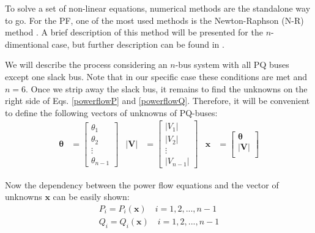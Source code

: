 \documentclass[a4paper,11pt, titlepage, twoside]{article}
\begin{document}
To solve a set of non-linear equations, numerical methods are the standalone way to go. For the PF, one of the most used methods is the Newton-Raphson (N-R) method \cite{NRusual}. A brief description of this method will be presented for the $n$-dimentional case, but further description can be found in \cite{llibrebase}.

We will describe the process considering an $n$-bus system with all PQ buses except one slack bus. Note that in our specific case these conditions are met and $n = 6$. Once we strip away the slack bus, it remains to find the unknowns on the right side of Eqs. \ref{powerflowP} and \ref{powerflowQ}. Therefore, it will be convenient to
define the following vectors of unknowns of PQ-buses:
\begin{equation}
\begin{aligned}
    \mathbf{\theta} &= \begin{bmatrix}
    \theta_1 \\
    \theta_2 \\
    \vdots \\
    \theta_{n-1}
    \end{bmatrix} &
    \mathbf{|V|} &= \begin{bmatrix}
    |V_1| \\
    |V_2| \\
    \vdots \\
    |V_{n-1}|
    \end{bmatrix} &
    \mathbf{x} &= \begin{bmatrix}
    \mathbf{\theta} \\
    \mathbf{|V|} \\
    \end{bmatrix}
\end{aligned}
\end{equation}

Now the dependency between the power flow equations and the vector of unknowns $\mathbf{x}$ can be easily shown:
\begin{subequations}
\begin{align}
    P_i = P_i(\mathbf{x}) \quad i = 1,2,...,n-1 \\
    Q_i = Q_i(\mathbf{x}) \quad i = 1,2,...,n-1
\end{align}       
\end{subequations}
\end{document}
